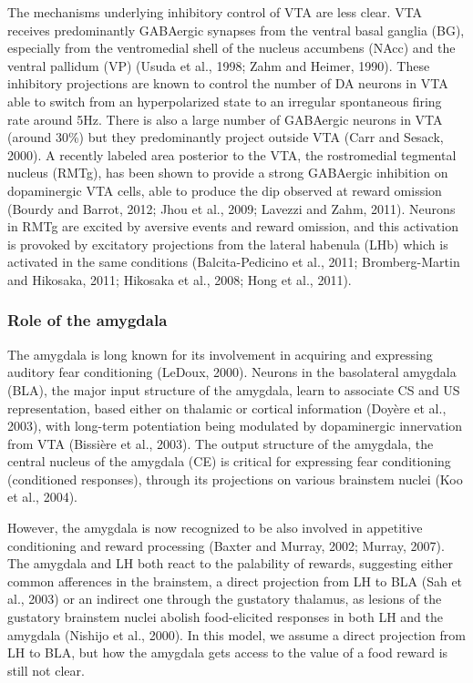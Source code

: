 \documentclass[
  11pt,
  a4paper,
]{scrbook}
\begin{document}
The mechanisms underlying inhibitory control of VTA are less clear. VTA
receives predominantly GABAergic synapses from the ventral basal ganglia
(BG), especially from the ventromedial shell of the nucleus accumbens
(NAcc) and the ventral pallidum (VP) (Usuda et al., 1998; Zahm and
Heimer, 1990). These inhibitory projections are known to control the
number of DA neurons in VTA able to switch from an hyperpolarized state
to an irregular spontaneous firing rate around 5Hz. There is also a
large number of GABAergic neurons in VTA (around 30\%) but they
predominantly project outside VTA (Carr and Sesack, 2000). A recently
labeled area posterior to the VTA, the rostromedial tegmental nucleus
(RMTg), has been shown to provide a strong GABAergic inhibition on
dopaminergic VTA cells, able to produce the dip observed at reward
omission (Bourdy and Barrot, 2012; Jhou et al., 2009; Lavezzi and Zahm,
2011). Neurons in RMTg are excited by aversive events and reward
omission, and this activation is provoked by excitatory projections from
the lateral habenula (LHb) which is activated in the same conditions
(Balcita-Pedicino et al., 2011; Bromberg-Martin and Hikosaka, 2011;
Hikosaka et al., 2008; Hong et al., 2011).

\subsubsection*{Role of the amygdala}\label{role-of-the-amygdala}

The amygdala is long known for its involvement in acquiring and
expressing auditory fear conditioning (LeDoux, 2000). Neurons in the
basolateral amygdala (BLA), the major input structure of the amygdala,
learn to associate CS and US representation, based either on thalamic or
cortical information (Doyère et al., 2003), with long-term potentiation
being modulated by dopaminergic innervation from VTA (Bissière et al.,
2003). The output structure of the amygdala, the central nucleus of the
amygdala (CE) is critical for expressing fear conditioning (conditioned
responses), through its projections on various brainstem nuclei (Koo et
al., 2004).

However, the amygdala is now recognized to be also involved in
appetitive conditioning and reward processing (Baxter and Murray, 2002;
Murray, 2007). The amygdala and LH both react to the palability of
rewards, suggesting either common afferences in the brainstem, a direct
projection from LH to BLA (Sah et al., 2003) or an indirect one through
the gustatory thalamus, as lesions of the gustatory brainstem nuclei
abolish food-elicited responses in both LH and the amygdala (Nishijo et
al., 2000). In this model, we assume a direct projection from LH to BLA,
but how the amygdala gets access to the value of a food reward is still
not clear.
\end{document}
